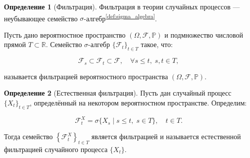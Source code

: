 \documentclass[a4paper,12pt]{article}
\theoremstyle{definition}
\newtheorem{definition}{Определение}[section]
\begin{document}
\begin{definition}[Фильтрация]
    \label{def:filtration}
    Фильтрация в теории случайных процессов — неубывающее семейство $\sigma$-алгебр\textsuperscript{\ref{def:sigma_algebra}}.
    
    Пусть дано вероятностное пространство $(\Omega,{\mathcal {F}},\mathbb {P})$ и подмножество числовой прямой $T\subset \mathbb {R}$. Семейство $\sigma$-алгебр $\{\mathcal {F}_{t}\}_{t\in T}$ такое, что:

    \begin{equation*}
        {\mathcal  {F}}_{s}\subset {\mathcal  {F}}_{t}\subset {\mathcal  {F}},\quad \forall s\leq t,\;s,t\in T,
    \end{equation*}
    
    называется фильтрацией вероятностного пространства $(\Omega,{\mathcal {F}},\mathbb {P})$.

\end{definition}

\begin{definition}[Естественная фильтрация]
    \label{def:natural_filtration}
    Пусть дан случайный процесс $\{X_{t}\}_{t\in T}$, определённый на некотором вероятностном пространстве. Определим:

    \begin{equation*}
        {\mathcal  {F}}_{t}^{X}=\sigma \{X_{s}\mid s\leq t,\;s\in T\},\quad t\in T.
    \end{equation*}
    
    Тогда семейство $\left\{{\mathcal  {F}}_{t}^{X}\right\}_{{t\in T}}$ является фильтрацией и называется естественной фильтрацией случайного процесса $\{X_{t}\}$.

\end{definition}
\end{document}
